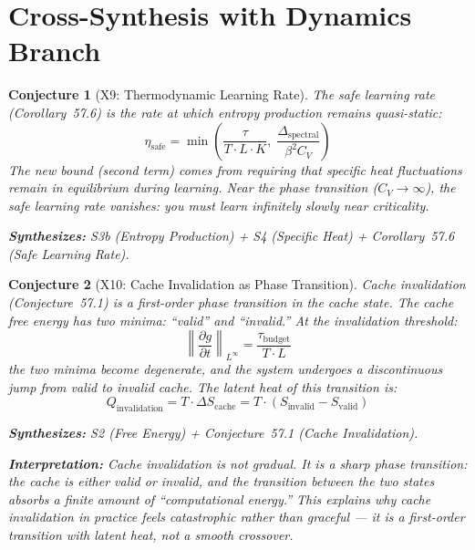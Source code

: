 \documentclass[11pt,letterpaper]{article}
\newtheorem{conjecture}{Conjecture}[section]
\newcommand{\tbudget}{\tau_{\mathrm{budget}}}
\begin{document}
\section{Cross-Synthesis with Dynamics Branch}

\begin{conjecture}[X9: Thermodynamic Learning 
Rate]\label{conj:x_learning}
The safe learning rate (Corollary~57.6) is the rate at which entropy 
production remains quasi-static:
\begin{equation}
    \eta_{\mathrm{safe}} = \min\left(\frac{\tau}{T \cdot L \cdot K}, \;
    \frac{\Delta_{\mathrm{spectral}}}{\beta^2 C_V}\right)
\end{equation}
The new bound (second term) comes from requiring that specific heat 
fluctuations remain in equilibrium during learning. Near the phase 
transition ($C_V \to \infty$), the safe learning rate vanishes: you must 
learn infinitely slowly near criticality.

\textbf{Synthesizes:} S3b (Entropy Production) + S4 (Specific Heat) + 
Corollary~57.6 (Safe Learning Rate).
\end{conjecture}

\begin{conjecture}[X10: Cache Invalidation as Phase 
Transition]\label{conj:x_invalidation}
Cache invalidation (Conjecture~57.1) is a first-order phase transition 
in the cache state. The cache free energy has two minima: ``valid'' and 
``invalid.'' At the invalidation threshold:
\begin{equation}
    \left\|\frac{\partial g}{\partial t}\right\|_{L^\infty} 
    = \frac{\tbudget}{T \cdot L}
\end{equation}
the two minima become degenerate, and the system undergoes a discontinuous 
jump from valid to invalid cache. The latent heat of this transition is:
\begin{equation}
    Q_{\mathrm{invalidation}} = T \cdot \Delta S_{\mathrm{cache}} 
    = T \cdot (S_{\mathrm{invalid}} - S_{\mathrm{valid}})
\end{equation}

\textbf{Synthesizes:} S2 (Free Energy) + Conjecture~57.1 
(Cache Invalidation).

\textbf{Interpretation:} Cache invalidation is not gradual. It is a 
sharp phase transition: the cache is either valid or invalid, and the 
transition between the two states absorbs a finite amount of 
``computational energy.'' This explains why cache invalidation in practice 
feels catastrophic rather than graceful --- it is a first-order transition 
with latent heat, not a smooth crossover.
\end{conjecture}
\end{document}
